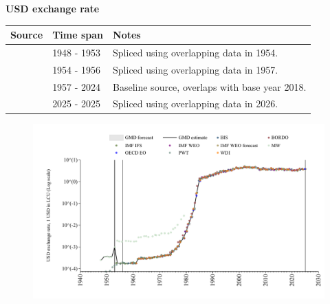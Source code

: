 \documentclass[12pt,a4paper,landscape]{article}
\begin{document}
\begin{adjustbox}{max totalsize={\paperwidth}{\paperheight},center}
\begin{minipage}[t][\textheight][t]{\textwidth}
\vspace*{0.5cm}
{}
\begin{center}
{\Large\bfseries USD exchange rate}
\end{center}
\vspace{0.5cm}
\begin{table}[H]
\centering
\small
\begin{tabular}{|l|l|l|}
\hline
\textbf{Source} & \textbf{Time span} & \textbf{Notes} \\
\hline
\rowcolor{white}\cite{MW}& 1948 - 1953 &Spliced using overlapping data in 1954. \\
\rowcolor{lightgray}\cite{IMF_IFS}& 1954 - 1956 &Spliced using overlapping data in 1957. \\
\rowcolor{white}\cite{BIS}& 1957 - 2024 &Baseline source, overlaps with base year 2018. \\
\rowcolor{lightgray}\cite{OECD_EO}& 2025 - 2025 &Spliced using overlapping data in 2026. \\
\hline
\end{tabular}
\end{table}
\begin{figure}[H]
\centering
\includegraphics[width=\textwidth,height=0.6\textheight,keepaspectratio]{graphs/ISR_USDfx.pdf}
\end{figure}
\end{minipage}
\end{adjustbox}
\end{document}

